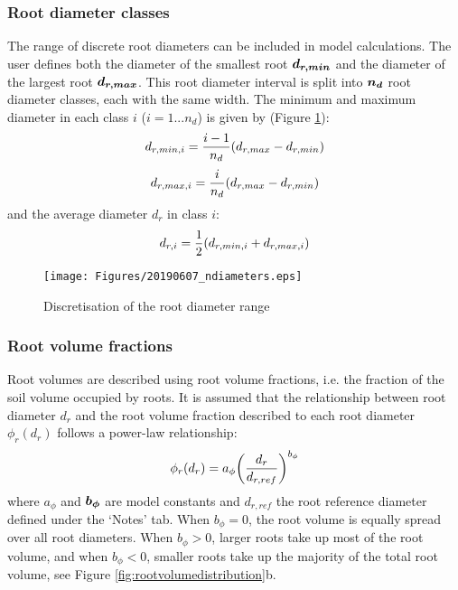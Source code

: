 \documentclass[a4 paper, 11  pt]{article}
\begin{document}
\subsubsection{Root diameter classes}
The range of discrete root diameters can be included in model calculations.
The user defines both the diameter of the smallest root $\vb*{d_{r,min}}$ and the diameter of the largest root $\vb*{d_{r,max}}$. This root diameter interval is split into $\vb*{n_d}$ root diameter classes, each with the same width. The minimum and maximum diameter in each class $i$ ($i=1...n_d$) is given by (Figure \ref{fig:ndiameters}):
\begin{equation}
	d_{r,min,i} = \frac{i-1}{n_d} \qty( d_{r,max}-d_{r,min} )
\end{equation}
\begin{equation}
	d_{r,max,i} = \frac{i}{n_d} \qty( d_{r,max}-d_{r,min} )
\end{equation}
and the average diameter $d_r$ in class $i$:
\begin{equation}
	d_{r,i} = \frac{1}{2} \qty( d_{r,min,i} + d_{r,max,i} )
\end{equation}
\begin{figure}
	\centering
		\texttt{[image: Figures/20190607\_ndiameters.eps]}
	\caption{Discretisation of the root diameter range}
	\label{fig:ndiameters}
\end{figure}

\subsubsection{Root volume fractions}
Root volumes are described using root volume fractions, i.e. the fraction of the soil volume occupied by roots. It is assumed that the relationship between root diameter $d_r$ and the root volume fraction described to each root diameter $\phi_r(d_r)$ follows a power-law relationship:
\begin{equation}
	\phi_r(d_r) = a_\phi \qty( \frac{d_r}{d_{r,ref}} )^{b_\phi}
	\label{eq:phirdr}
\end{equation}
where $a_\phi$ and $\vb*{b_\phi}$ are model constants and $d_{r,ref}$ the root reference diameter defined under the `Notes' tab. When $b_\phi=0$, the root volume is equally spread over all root diameters. When $b_\phi>0$, larger roots take up most of the root volume, and when $b_\phi<0$, smaller roots take up the majority of the total root volume, see Figure \ref{fig:rootvolumedistribution}b.
\end{document}
